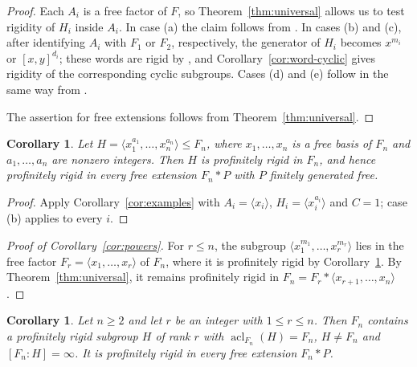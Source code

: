 \documentclass[11pt]{amsart}
\theoremstyle{plain}
\newtheorem{corollary}[theorem]{Corollary}
\theoremstyle{definition}
\newcommand{\acl}{\operatorname{acl}}
\begin{document}
\begin{proof}
Each $A_i$ is a free factor of $F$, so Theorem~\ref{thm:universal} allows us to
test rigidity of $H_i$ inside $A_i$.  In case (a) the claim follows from
\cite{PP}.  In cases (b) and (c), after identifying
$A_i$ with $F_1$ or $F_2$, respectively, the generator of $H_i$ becomes
$x^{m_i}$ or $[x,y]^{d_i}$; these words are rigid by \cite{HMP}, and
Corollary~\ref{cor:word-cyclic} gives rigidity of the corresponding cyclic
subgroups.  Cases (d) and (e) follow in the same way from \cite{AF, Wilton2}.


The assertion for free extensions follows from Theorem~\ref{thm:universal}.
\end{proof}


\begin{corollary}\label{cor:powers-basis}
Let $H=\langle x_1^{a_1},\dots,x_n^{a_n}\rangle\le F_n$, where $x_1,\dots,x_n$ is
a free basis of $F_n$ and $a_1,\dots,a_n$ are nonzero integers.  Then $H$ is
profinitely rigid in $F_n$, and hence profinitely rigid in every free extension
$F_n*P$ with $P$ finitely generated free.
\end{corollary}

\begin{proof}
Apply Corollary~\ref{cor:examples} with $A_i=\langle x_i\rangle$,
$H_i=\langle x_i^{a_i}\rangle$ and $C=1$; case (b) applies to every $i$. 
\end{proof}

\begin{proof}[Proof of Corollary~\ref{cor:powers}]
For $r\le n$, the subgroup $\langle x_1^{m_1},\dots,x_r^{m_r}\rangle$ lies in the
free factor $F_r=\langle x_1,\dots,x_r\rangle$ of $F_n$, where it is profinitely
rigid by Corollary~\ref{cor:powers-basis}.  By Theorem~\ref{thm:universal}, it
remains profinitely rigid in $F_n=F_r*\langle x_{r+1},\dots,x_n\rangle$.
\end{proof}


\begin{corollary}\label{cor:ranks}
Let $n\ge2$ and let $r$ be an integer with $1\le r\le n$.  Then
$F_n$ contains a profinitely rigid subgroup $H$ of rank $r$ with
$\acl_{F_n}(H)=F_n$, $H\neq F_n$ and $[F_n:H]=\infty$.  It is profinitely rigid
in every free extension $F_n*P$.
\end{corollary}
\end{document}
